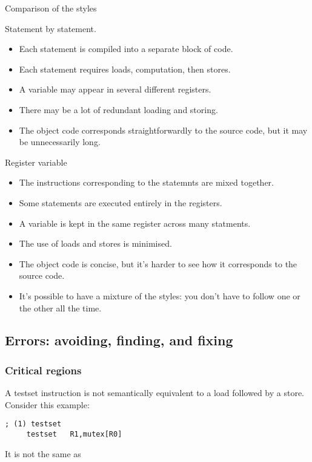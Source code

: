 \documentclass[11pt]{article}
\begin{document}
Comparison of the styles

Statement by statement.
\begin{itemize}
\item Each statement is compiled into a separate block of code.
\item Each statement requires loads, computation, then stores.
\item A variable may appear in several different registers.
\item There may be a lot of redundant loading and storing.
\item The object code corresponds straightforwardly to the source
code, but it may be unnecessarily long.
\end{itemize}

Register variable
\begin{itemize}
\item The instructions corresponding to the statemnts are mixed
together.
\item Some statements are executed entirely in the registers.
\item A variable is kept in the same register across many
statments.
\item The use of loads and stores is minimised.
\item The object code is concise, but it's harder to see how it
corresponds to the source code.
\item It's possible to have a mixture of the styles: you don't have
to follow one or the other all the time.
\end{itemize}

\subsection*{Errors: avoiding, finding, and fixing}
\label{sec:org8db247d}

\subsubsection*{Critical regions}
\label{sec:org135a27c}

A testset instruction is not semantically equivalent to a load
followed by a store.  Consider this example:

\begin{verbatim}
; (1) testset
     testset   R1,mutex[R0]
\end{verbatim}

It is not the same as
\end{document}
